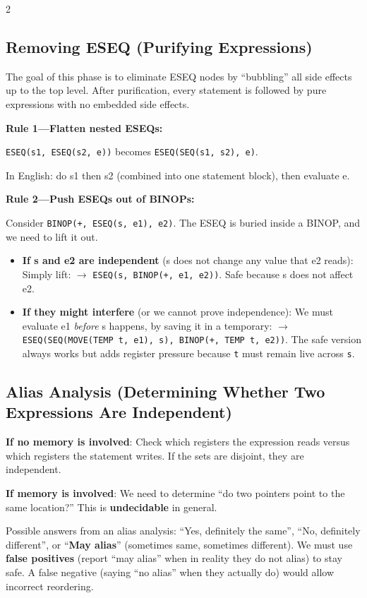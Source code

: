 \documentclass[9pt,landscape]{extarticle}
\begin{document}
\begin{multicols}{2}
\subsection{Removing ESEQ (Purifying Expressions)}

The goal of this phase is to eliminate ESEQ nodes by ``bubbling'' all side effects up to the top level. After purification, every statement is followed by pure expressions with no embedded side effects.

\textbf{Rule 1---Flatten nested ESEQs:}

\texttt{ESEQ(s1, ESEQ(s2, e))} becomes \texttt{ESEQ(SEQ(s1, s2), e)}.

In English: do s1 then s2 (combined into one statement block), then evaluate e.

\textbf{Rule 2---Push ESEQs out of BINOPs:}

Consider \texttt{BINOP(+, ESEQ(s, e1), e2)}. The ESEQ is buried inside a BINOP, and we need to lift it out.
\begin{itemize}
  \item \textbf{If s and e2 are independent} (s does not change any value that e2 reads): Simply lift: $\to$ \texttt{ESEQ(s, BINOP(+, e1, e2))}. Safe because s does not affect e2.
  \item \textbf{If they might interfere} (or we cannot prove independence): We must evaluate e1 \emph{before} s happens, by saving it in a temporary: $\to$ \texttt{ESEQ(SEQ(MOVE(TEMP t, e1), s), BINOP(+, TEMP t, e2))}. The safe version always works but adds register pressure because \texttt{t} must remain live across \texttt{s}.
\end{itemize}

\subsection{Alias Analysis (Determining Whether Two Expressions Are Independent)}

\textbf{If no memory is involved}: Check which registers the expression reads versus which registers the statement writes. If the sets are disjoint, they are independent.

\textbf{If memory is involved}: We need to determine ``do two pointers point to the same location?'' This is \textbf{undecidable} in general.

Possible answers from an alias analysis: ``Yes, definitely the same'', ``No, definitely different'', or ``\textbf{May alias}'' (sometimes same, sometimes different). We must use \textbf{false positives} (report ``may alias'' when in reality they do not alias) to stay safe. A false negative (saying ``no alias'' when they actually do) would allow incorrect reordering.


\end{multicols}
\end{document}
